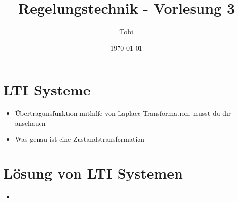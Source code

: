 \documentclass[11pt]{article}
\title{Regelungstechnik - Vorlesung 3}
\author{Tobi}
\date{\today}
\begin{document}
\maketitle

\section{LTI Systeme}

\begin{itemize}
    \item Übertragunsfunktion mithilfe von Laplace Transformation, musst du dir anschauen
    \item Was genau ist eine Zustandstransformation
\end{itemize}

\section{Lösung von LTI Systemen}

\begin{itemize}
    \item 
\end{itemize}
\end{document}
